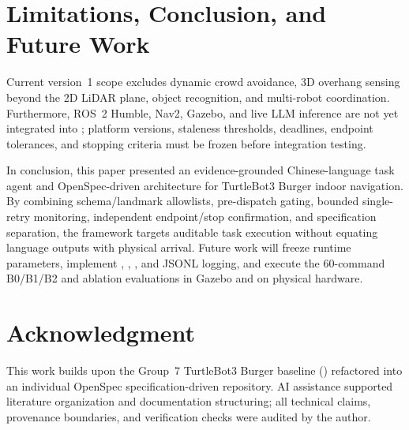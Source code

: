 \documentclass[conference,a4paper]{IEEEtran}
\begin{document}
\section{Limitations, Conclusion, and Future Work}

Current version~1 scope excludes dynamic crowd avoidance, 3D overhang sensing beyond the 2D LiDAR plane, object recognition, and multi-robot coordination. Furthermore, ROS~2 Humble, Nav2, Gazebo, and live LLM inference are not yet integrated into ; platform versions, staleness thresholds, deadlines, endpoint tolerances, and stopping criteria must be frozen before integration testing.

In conclusion, this paper presented an evidence-grounded Chinese-language task agent and OpenSpec-driven architecture for TurtleBot3 Burger indoor navigation. By combining schema/landmark allowlists, pre-dispatch gating, bounded single-retry monitoring, independent endpoint/stop confirmation, and specification separation, the framework targets auditable task execution without equating language outputs with physical arrival. Future work will freeze runtime parameters, implement , , , and JSONL logging, and execute the 60-command B0/B1/B2 and ablation evaluations in Gazebo and on physical hardware.

\section*{Acknowledgment}

This work builds upon the Group~7 TurtleBot3 Burger baseline () refactored into an individual OpenSpec specification-driven repository. AI assistance supported literature organization and documentation structuring; all technical claims, provenance boundaries, and verification checks were audited by the author.
\end{document}
